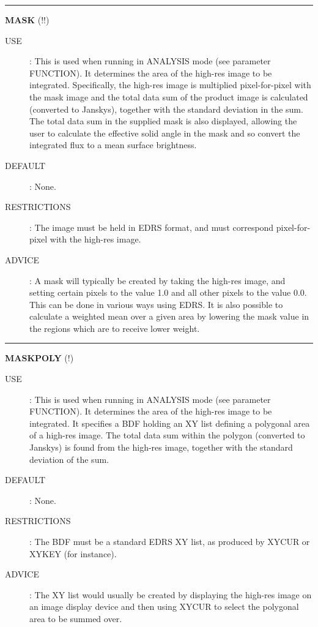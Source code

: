 \rule{\textwidth}{0.3mm}
{\Large {\bf MASK } (!!)}
\begin{description}
\item [USE]:
This is used when running in ANALYSIS mode (see parameter FUNCTION). It 
determines the area of the high-res image to be integrated. Specifically, the
high-res image is multiplied pixel-for-pixel with the mask image and the total 
data sum of the product image is calculated (converted to Janskys), together 
with the standard deviation in the sum. The total data sum in the supplied mask
is also displayed, allowing the user to calculate the effective solid angle in
the mask and so convert the integrated flux to a mean surface brightness. 

\item [DEFAULT]:
None.
\item [RESTRICTIONS]:
The image must be held in EDRS format, and must correspond pixel-for-pixel with 
the high-res image.
\item [ADVICE]:
A mask will typically be created by taking the high-res image, and setting 
certain pixels to the value 1.0 and all other pixels to the value 0.0. This can 
be done in various ways using EDRS. It is also possible to calculate a weighted 
mean over a given area by lowering the mask value in the regions which are to 
receive lower weight.
\end {description}

\rule{\textwidth}{0.3mm}
{\Large {\bf MASKPOLY } (!)}
\begin{description}
\item [USE]:
This is used when running in ANALYSIS mode (see parameter FUNCTION). It 
determines the area of the high-res image to be integrated. 
It specifies a BDF holding an XY list defining a polygonal area of a high-res 
image. The total data sum within the polygon (converted to Janskys) is found 
from the high-res image, together with the standard deviation of the sum.
\item [DEFAULT]:
None.
\item [RESTRICTIONS]:
The BDF must be a standard EDRS XY list, as produced by XYCUR or XYKEY (for 
instance).
\item [ADVICE]:
The XY list would usually be created by displaying the high-res image on an 
image display device and then using XYCUR to select the polygonal area to be 
summed over.
\end {description}

